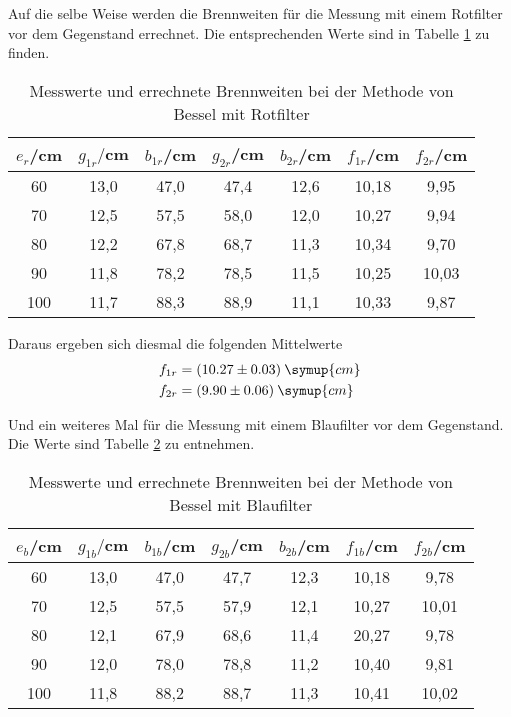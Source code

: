 Auf die selbe Weise werden die Brennweiten für die Messung mit einem Rotfilter vor dem Gegenstand errechnet. Die
entsprechenden Werte sind in Tabelle \ref{tab:besselrot} zu finden.
\begin{table}[H]
  \centering
  \caption{Messwerte und errechnete Brennweiten bei der Methode von Bessel mit Rotfilter}
  \label{tab:besselrot}
  \begin{tabular}{c c c c c c c}
    \toprule
    $e_r$/cm  & $g_{1r}/$cm & $b_{1r}$/cm & $g_{2r}$/cm & $b_{2r}$/cm & $f_{1r}$/cm & $f_{2r}$/cm \\
    \midrule
    60  &   13,0 &  47,0  &  47,4  &  12,6 & 10,18 & 9,95  \\
    70   &  12,5 &  57,5  &  58,0  &  12,0 & 10,27 & 9,94 \\
    80   &  12,2 &  67,8  &  68,7  &  11,3 & 10,34 & 9,70 \\
    90   &  11,8 &  78,2  &  78,5  &  11,5 & 10,25 & 10,03 \\
    100  &  11,7 &  88,3  &  88,9  &  11,1 & 10,33 & 9,87 \\
    \bottomrule
  \end{tabular}
\end{table}

Daraus ergeben sich diesmal die folgenden Mittelwerte
\begin{align*}
  &f_{1r} = (10.27 \pm 0.03) \: \symup{cm} \\
  &f_{2r} = (9.90 \pm 0.06) \: \symup{cm}
\end{align*}

Und ein weiteres Mal für die Messung mit einem Blaufilter vor dem Gegenstand. Die Werte sind Tabelle
\ref{tab:besselblau} zu entnehmen.
\begin{table}[H]
  \centering
  \caption{Messwerte und errechnete Brennweiten bei der Methode von Bessel mit Blaufilter}
  \label{tab:besselblau}
  \begin{tabular}{c c c c c c c}
    \toprule
    $e_b$/cm  & $g_{1b}/$cm & $b_{1b}$/cm & $g_{2b}$/cm & $b_{2b}$/cm & $f_{1b}$/cm & $f_{2b}$/cm \\
    \midrule
    60  &   13,0 &  47,0  &  47,7  &  12,3 & 10,18 & 9,78 \\
    70   &  12,5 &  57,5  &  57,9  &  12,1 & 10,27 & 10,01 \\
    80   &  12,1 &  67,9  &  68,6  &  11,4 & 20,27 & 9,78 \\
    90   &  12,0 &  78,0  &  78,8  &  11,2 & 10,40 & 9,81 \\
    100  &  11,8 &  88,2  &  88,7  &  11,3 & 10,41 & 10,02 \\
    \bottomrule
  \end{tabular}
\end{table}


